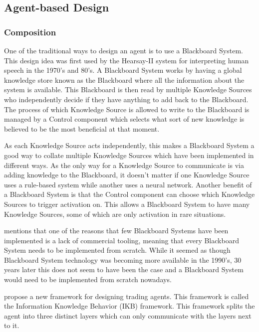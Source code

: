 \subsection{Agent-based Design}

\subsubsection{Composition}

One of the traditional ways to design an agent is to use a Blackboard System.
This design idea was first used by the Hearsay-II system for interpreting human speech in the 1970's and 80's.
A Blackboard System works by having a global knowledge store known as the Blackboard where all the information about the system is available.
This Blackboard is then read by multiple Knowledge Sources who independently decide if they have anything to add back to the Blackboard.
The process of which Knowledge Source is allowed to write to the Blackboard is managed by a Control component which selects what sort of new knowledge is believed to be the most beneficial at that moment.~\cite{nii1986blackboard}

As each Knowledge Source acts independently, this makes a Blackboard System a good way to collate multiple Knowledge Sources which have been implemented in different ways.
As the only way for a Knowledge Source to communicate is via adding knowledge to the Blackboard, it doesn't matter if one Knowledge Source uses a rule-based system while another uses a neural network.
Another benefit of a Blackboard System is that the Control component can choose which Knowledge Sources to trigger activation on.
This allows a Blackboard System to have many Knowledge Sources, some of which are only activation in rare situations.~\cite{corkill1991blackboard}

 mentions that one of the reasons that few Blackboard Systems have been implemented is a lack of commercial tooling, meaning that every Blackboard System needs to be implemented from scratch.
While it seemed as though Blackboard System technology was becoming more available in the 1990's, 30 years later this does not seem to have been the case and a Blackboard System would need to be implemented from scratch nowadays.

 propose a new framework for designing trading agents.
This framework is called the Information Knowledge Behavior (IKB) framework.
This framework splits the agent into three distinct layers which can only communicate with the layers next to it.

